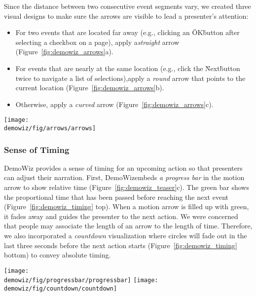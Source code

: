 Since the distance between two consecutive event segments vary, we created three visual designs to make sure the arrows are visible to lead a presenter's attention:

\begin{itemize}
  \itemsep -2pt
  \item For two events that are located far away (e.g., clicking an \"OK\" button after selecting a checkbox on a page), apply a\textit{straight} arrow (Figure~\ref{fig:demowiz_arrows}a).
  \item For events that are nearly at the same location (e.g., click the \"Next\" button twice to navigate a list of selections),apply a \textit{round} arrow that points to the current location (Figure~\ref{fig:demowiz_arrows}b).
  \item Otherwise, apply a \textit{curved} arrow (Figure~\ref{fig:demowiz_arrows}c).
\end{itemize}

\begin{figure*}[t]
  \centering
  \texttt{[image: \\demowiz/fig/arrows/arrows]}
  \caption{Three types of motion arrows in DemoWiz that guide presenters to the next event of different distances at a (A) far, (B) nearly the same, and (C) near location.}
  \label{fig:demowiz_arrows}
\end{figure*}


\subsubsection{Sense of Timing}
DemoWiz provides a sense of timing for an upcoming action so that presenters can adjust their narration. First, DemoWizembeds \textit{a progress bar} in the motion arrow to show relative time (Figure~\ref{fig:demowiz_teaser}c). The green bar shows the proportional time that has been passed before reaching the next event (Figure~\ref{fig:demowiz_timing} top). When a motion arrow is filled up with green, it fades away and guides the presenter to the next action. We were concerned that people may associate the length of an arrow to the length of time. Therefore, we also incorporated a \textit{countdown} visualization where circles will fade out in the last three seconds before the next action starts (Figure~\ref{fig:demowiz_timing} bottom) to convey absolute timing.

\begin{figure*}[t]
  \centering
  \texttt{[image: \\demowiz/fig/progressbar/progressbar]}
  \texttt{[image: \\demowiz/fig/countdown/countdown]}
  \caption{A progress in time guides the presenter from the current event (left) gradually to the upcoming action (right) using relative timing with a progress bar (top) and absolute timing (bottom).}
  \label{fig:demowiz_timing}
\end{figure*}

